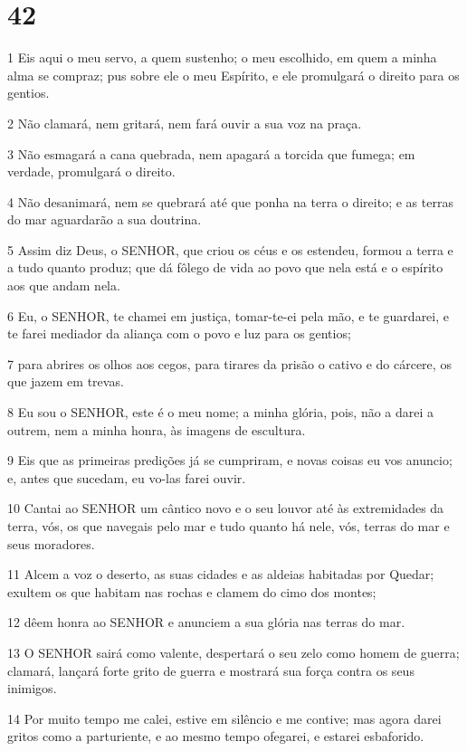 \chapter{42}

\par 1 Eis aqui o meu servo, a quem sustenho; o meu escolhido, em quem a minha alma se compraz; pus sobre ele o meu Espírito, e ele promulgará o direito para os gentios.
\par 2 Não clamará, nem gritará, nem fará ouvir a sua voz na praça.
\par 3 Não esmagará a cana quebrada, nem apagará a torcida que fumega; em verdade, promulgará o direito.
\par 4 Não desanimará, nem se quebrará até que ponha na terra o direito; e as terras do mar aguardarão a sua doutrina.
\par 5 Assim diz Deus, o SENHOR, que criou os céus e os estendeu, formou a terra e a tudo quanto produz; que dá fôlego de vida ao povo que nela está e o espírito aos que andam nela.
\par 6 Eu, o SENHOR, te chamei em justiça, tomar-te-ei pela mão, e te guardarei, e te farei mediador da aliança com o povo e luz para os gentios;
\par 7 para abrires os olhos aos cegos, para tirares da prisão o cativo e do cárcere, os que jazem em trevas.
\par 8 Eu sou o SENHOR, este é o meu nome; a minha glória, pois, não a darei a outrem, nem a minha honra, às imagens de escultura.
\par 9 Eis que as primeiras predições já se cumpriram, e novas coisas eu vos anuncio; e, antes que sucedam, eu vo-las farei ouvir.
\par 10 Cantai ao SENHOR um cântico novo e o seu louvor até às extremidades da terra, vós, os que navegais pelo mar e tudo quanto há nele, vós, terras do mar e seus moradores.
\par 11 Alcem a voz o deserto, as suas cidades e as aldeias habitadas por Quedar; exultem os que habitam nas rochas e clamem do cimo dos montes;
\par 12 dêem honra ao SENHOR e anunciem a sua glória nas terras do mar.
\par 13 O SENHOR sairá como valente, despertará o seu zelo como homem de guerra; clamará, lançará forte grito de guerra e mostrará sua força contra os seus inimigos.
\par 14 Por muito tempo me calei, estive em silêncio e me contive; mas agora darei gritos como a parturiente, e ao mesmo tempo ofegarei, e estarei esbaforido.
